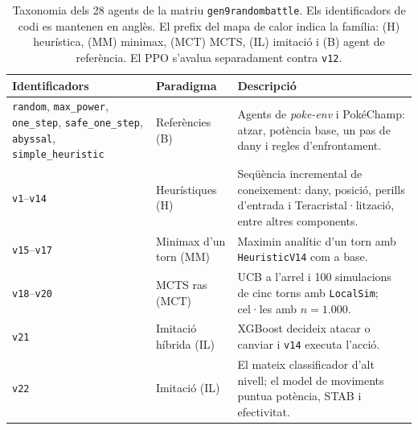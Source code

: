 \begin{table}[htbp]
\centering
\caption[Taxonomia dels 28 agents de la matriu.]{Taxonomia dels 28 agents de la matriu \texttt{gen9randombattle}. Els identificadors de codi es mantenen en anglès. El prefix del mapa de calor indica la família: (H) heurística, (MM) minimax, (MCT) MCTS, (IL) imitació i (B) agent de referència. El PPO s'avalua separadament contra \texttt{v12}.}
\label{tab:taxonomy}
\small
\renewcommand{\arraystretch}{1.3}
\begin{tabularx}{\textwidth}{>{\raggedright\arraybackslash}p{3.4cm}>{\raggedright\arraybackslash}p{3.1cm}X}
\toprule
\textbf{Identificadors} & \textbf{Paradigma} & \textbf{Descripció} \\
\midrule
\texttt{random}, \texttt{max\_power},\newline
\texttt{one\_step}, \texttt{safe\_one\_step},\newline
\texttt{abyssal}, \texttt{simple\_heuristic}
  & Referències (B)
  & Agents de \textit{poke-env} i PokéChamp: atzar, potència base, un pas de dany i regles d'enfrontament. \\
\arrayrulecolor{gray!30}\hline\arrayrulecolor{black}
\texttt{v1}--\texttt{v14}
  & Heurístiques (H)
  & Seqüència incremental de coneixement: dany, posició, perills d'entrada i Teracristal·lització, entre altres components. \\
\arrayrulecolor{gray!30}\hline\arrayrulecolor{black}
\texttt{v15}--\texttt{v17}
  & Minimax d'un torn (MM)
  & Maximin analític d'un torn amb \texttt{HeuristicV14} com a base. \\
\arrayrulecolor{gray!30}\hline\arrayrulecolor{black}
\texttt{v18}--\texttt{v20}
  & MCTS ras (MCT)
  & UCB a l'arrel i 100 simulacions de cinc torns amb \texttt{LocalSim}; cel·les amb $n=1.000$. \\
\arrayrulecolor{gray!30}\hline\arrayrulecolor{black}
\texttt{v21}
  & Imitació híbrida (IL)
  & XGBoost decideix atacar o canviar i \texttt{v14} executa l'acció. \\
\arrayrulecolor{gray!30}\hline\arrayrulecolor{black}
\texttt{v22}
  & Imitació (IL)
  & El mateix classificador d'alt nivell; el model de moviments puntua potència, STAB i efectivitat. \\
\bottomrule
\end{tabularx}
\end{table}
